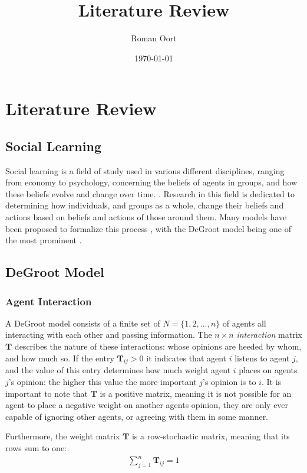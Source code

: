 \documentclass{article}
\title{Literature Review}
\author{Roman Oort}
\date{\today}
\newcommand{\T}{\textbf{T}}
\newcommand{\Tij}{\textbf{T}_{ij}}
\begin{document}
\maketitle

\tableofcontents

\newpage

\section{Literature Review}
\subsection{Social Learning}
Social learning is a field of study used in various different disciplines, ranging from economy to psychology, concerning the beliefs of agents in groups, and how these beliefs evolve and change over time. \cite{reed2010sociallearning}. Research in this field is dedicated to determining how individuals, and groups as a whole, change their beliefs and actions based on beliefs and actions of those around them. Many models have been proposed to formalize this process \cite{golub2017learning}, with the DeGroot model being one of the most prominent \cite{degroot1974concensus}.

\subsection{DeGroot Model}
\subsubsection{Agent Interaction}
A DeGroot model consists of a finite set of $N=\{1, 2, ..., n\}$ of agents all interacting with each other and passing information. The $n \times n$ \emph{interaction} matrix $\T$ describes the nature of these interactions: whose opinions are heeded by whom, and how much so. If the entry $\Tij > 0$ it indicates that agent $i$ listens to agent $j$, and the value of this entry determines how much weight agent $i$ places on agents $j$'s opinion: the higher this value the more important $j$'s opinion is to $i$. It is important to note that $\T$ is a positive matrix, meaning it is not possible for an agent to place a negative weight on another agents opinion, they are only ever capable of ignoring other agents, or agreeing with them in some manner. 

Furthermore, the weight matrix $\T$ is a row-stochastic matrix, meaning that its rows sum to one:
\begin{align*}
    \sum_{j=1}^{n} \Tij = 1
\end{align*}
\end{document}
